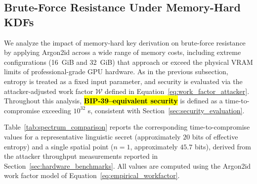 \documentclass[mathematics,article,accept,pdftex,moreauthors]{Definitions/mdpi}
\begin{document}
\subsection{Brute-Force Resistance Under Memory-Hard KDFs}
\label{sec:hardened_analysis}

We analyze the impact of memory-hard key derivation on brute-force resistance by applying Argon2id across a wide range of memory costs, including extreme configurations (16~GiB and 32~GiB) that approach or exceed the physical VRAM limits of professional-grade GPU hardware. As in the previous subsection, entropy is treated as a fixed input parameter, and security is evaluated via the attacker-adjusted work factor $\mathcal{W}$ defined in Equation~\eqref{eq:work_factor_attacker}. Throughout this analysis, \textbf{\hl{BIP-39–equivalent security}} is defined as a time-to-compromise exceeding $10^{32}$ s, consistent with Section~\ref{sec:security_evaluation}.

Table~\ref{tab:spectrum_comparison} reports the corresponding time-to-compromise values for a representative linguistic secret (approximately $20$ bits of effective entropy) and a single spatial point ($n=1$, approximately $45.7$ bits), derived from the attacker throughput measurements reported in Section~\ref{sec:hardware_benchmarks}. All values are computed using the Argon2id work factor model of Equation~\eqref{eq:empirical_workfactor}.
\end{document}
